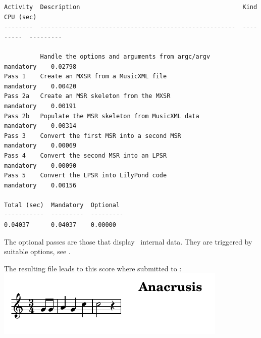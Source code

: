 \begin{lstlisting}[language=Terminal]
Activity  Description                                             Kind       CPU (sec)
--------  ------------------------------------------------------  ---------  ---------

          Handle the options and arguments from argc/argv         mandatory    0.02798
Pass 1    Create an MXSR from a MusicXML file                  mandatory    0.00420
Pass 2a   Create an MSR skeleton from the MXSR                    mandatory    0.00191
Pass 2b   Populate the MSR skeleton from MusicXML data            mandatory    0.00314
Pass 3    Convert the first MSR into a second MSR                 mandatory    0.00069
Pass 4    Convert the second MSR into an LPSR                     mandatory    0.00090
Pass 5    Convert the LPSR into LilyPond code                 mandatory    0.00156

Total (sec)  Mandatory  Optional
-----------  ---------  ---------
0.04037      0.04037    0.00000
\end{lstlisting}

The optional passes are those that display \mf\ internal data. They are triggered by suitable options, see .

The resulting  file leads to this score where submitted to \lily:\\
\includegraphics[scale=1]{../graphics/Anacrusis.png}
